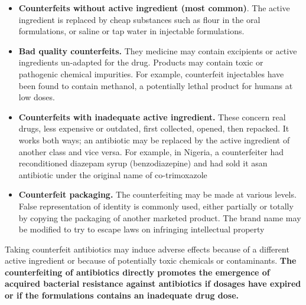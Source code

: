 \documentclass[
  11pt,
  paper=a4,
  ,captions=tableheading
]{scrartcl}
\providecommand{\tightlist}{%
  \setlength{\itemsep}{0pt}\setlength{\parskip}{0pt}}
\begin{document}
\begin{itemize}
\tightlist
\item
  \textbf{Counterfeits without active ingredient (most common)}. The
  active ingredient is replaced by cheap substances such as flour in the
  oral formulations, or saline or tap water in injectable formulations.
\item
  \textbf{Bad quality counterfeits.} They medicine may contain
  excipients or active ingredients un-adapted for the drug. Products may
  contain toxic or pathogenic chemical impurities. For example,
  counterfeit injectables have been found to contain methanol, a
  potentially lethal product for humans at low doses.
\item
  \textbf{Counterfeits with inadequate active ingredient.} These concern
  real drugs, less expensive or outdated, first collected, opened, then
  repacked. It works both ways; an antibiotic may be replaced by the
  active ingredient of another class and vice versa. For example, in
  Nigeria, a counterfeiter had reconditioned diazepam syrup
  (benzodiazepine) and had sold it asan antibiotic under the original
  name of co-trimoxazole
\item
  \textbf{Counterfeit packaging.} The counterfeiting may be made at
  various levels. False representation of identity is commonly used,
  either partially or totally by copying the packaging of another
  marketed product. The brand name may be modified to try to escape laws
  on infringing intellectual property
\end{itemize}

Taking counterfeit antibiotics may induce adverse effects because of a
different active ingredient or because of potentially toxic chemicals or
contaminants. \textbf{The counterfeiting of antibiotics directly
promotes the emergence of acquired bacterial resistance against
antibiotics if dosages have expired or if the formulations contains an
inadequate drug dose.}
\end{document}

